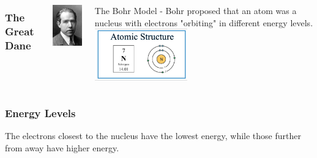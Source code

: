 \documentclass{beamer}
\begin{document}
\begin{frame}
    \begin{columns}
        \frametitle{The Great Dane}
        \begin{column}{0.5\textwidth}
            \includegraphics[width=3cm]{../../images/Bohr.jpg}
        \end{column}
        \begin{column}{0.5\textwidth}
            The Bohr Model - Bohr proposed that an atom was a nucleus with electrons "orbiting" in different 
            \pause \alert{energy levels}.
            \vspace{1cm}
        \includegraphics[width=4cm]{../../images/bohr_atom_N.jpg}
        \end{column}
    \end{columns}
\end{frame}

\begin{frame}
    \frametitle{Energy Levels}
    \onslide The electrons closest to the nucleus have the 
    \pause \alert{lowest} 
    \onslide energy, while those further from away have 
    \pause\alert{higher} 
    \onslide energy.
\end{frame}
\end{document}
